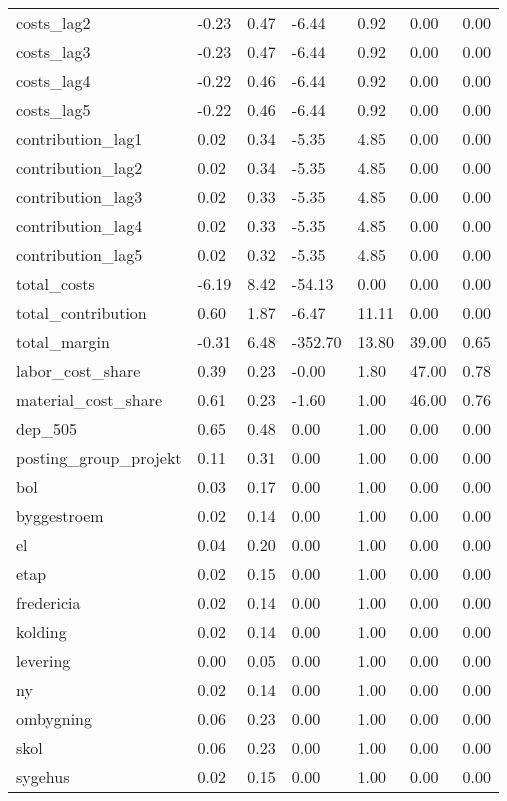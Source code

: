 \begin{landscape}
\begin{longtable}[h!]{lllllll}
costs_lag2 & -0.23 & 0.47 & -6.44 & 0.92 & 0.00 & 0.00 \\
costs_lag3 & -0.23 & 0.47 & -6.44 & 0.92 & 0.00 & 0.00 \\
costs_lag4 & -0.22 & 0.46 & -6.44 & 0.92 & 0.00 & 0.00 \\
costs_lag5 & -0.22 & 0.46 & -6.44 & 0.92 & 0.00 & 0.00 \\
contribution_lag1 & 0.02 & 0.34 & -5.35 & 4.85 & 0.00 & 0.00 \\
contribution_lag2 & 0.02 & 0.34 & -5.35 & 4.85 & 0.00 & 0.00 \\
contribution_lag3 & 0.02 & 0.33 & -5.35 & 4.85 & 0.00 & 0.00 \\
contribution_lag4 & 0.02 & 0.33 & -5.35 & 4.85 & 0.00 & 0.00 \\
contribution_lag5 & 0.02 & 0.32 & -5.35 & 4.85 & 0.00 & 0.00 \\
total_costs & -6.19 & 8.42 & -54.13 & 0.00 & 0.00 & 0.00 \\
total_contribution & 0.60 & 1.87 & -6.47 & 11.11 & 0.00 & 0.00 \\
total_margin & -0.31 & 6.48 & -352.70 & 13.80 & 39.00 & 0.65 \\
labor_cost_share & 0.39 & 0.23 & -0.00 & 1.80 & 47.00 & 0.78 \\
material_cost_share & 0.61 & 0.23 & -1.60 & 1.00 & 46.00 & 0.76 \\
dep_505 & 0.65 & 0.48 & 0.00 & 1.00 & 0.00 & 0.00 \\
posting_group_projekt & 0.11 & 0.31 & 0.00 & 1.00 & 0.00 & 0.00 \\
bol & 0.03 & 0.17 & 0.00 & 1.00 & 0.00 & 0.00 \\
byggestroem & 0.02 & 0.14 & 0.00 & 1.00 & 0.00 & 0.00 \\
el & 0.04 & 0.20 & 0.00 & 1.00 & 0.00 & 0.00 \\
etap & 0.02 & 0.15 & 0.00 & 1.00 & 0.00 & 0.00 \\
fredericia & 0.02 & 0.14 & 0.00 & 1.00 & 0.00 & 0.00 \\
kolding & 0.02 & 0.14 & 0.00 & 1.00 & 0.00 & 0.00 \\
levering & 0.00 & 0.05 & 0.00 & 1.00 & 0.00 & 0.00 \\
ny & 0.02 & 0.14 & 0.00 & 1.00 & 0.00 & 0.00 \\
ombygning & 0.06 & 0.23 & 0.00 & 1.00 & 0.00 & 0.00 \\
skol & 0.06 & 0.23 & 0.00 & 1.00 & 0.00 & 0.00 \\
sygehus & 0.02 & 0.15 & 0.00 & 1.00 & 0.00 & 0.00 \\

\end{longtable}
\end{landscape}
